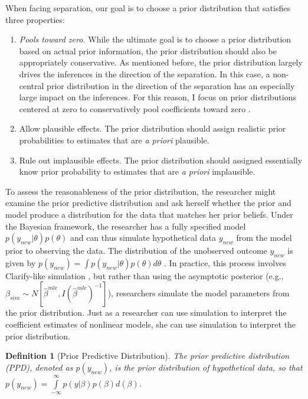 \documentclass[12pt]{article}
\newtheorem{defn}{Definition}
\begin{document}
When facing separation, our goal is to choose a prior distribution that satisfies three properties:
\begin{enumerate}
\item \emph{Pools toward zero.} While the ultimate goal is to choose a prior distribution based on actual prior information, the prior distribution should also be appropriately conservative. As mentioned before, the prior distribution largely drives the inferences in the direction of the separation. In this case, a non-central prior distribution in the direction of the separation has an especially large impact on the inferences. For this reason, I focus on prior distributions centered at zero to conservatively pool coefficients toward zero \citep{GelmanJakulin2007}.
\item Allow plausible effects. The prior distribution should assign realistic prior probabilities to estimates that are \textit{a priori} plausible. 
\item Rule out implausible effects. The prior distribution should assigned essentially know prior probability to estimates that are \textit{a priori} implausible.
\end{enumerate}

To assess the reasonableness of the prior distribution, the researcher might examine the prior predictive distribution and ask herself whether the prior and model produce a distribution for the data that matches her prior beliefs. Under the Bayesian framework, the researcher has a fully specified model $p(y_{new}|\theta)p(\theta)$ and can thus simulate hypothetical data $y_{new}$ from the model prior to observing the data. The distribution of the unobserved outcome $y_{new}$ is given by $p(y_{new}) = \int p(y_{new} | \theta)p(\theta) d\theta$ \citep{Box1980}. In practice, this process involves Clarify-like simulation \citep{KingTomzWittenberg2000}, but rather than using the asymptotic posterior (e.g., $\beta_{sim} \sim N\left[\hat{\beta}^{mle}, I(\hat{\beta}^{mle})^{-1}\right]$), researchers simulate the model parameters from the prior distribution. Just as a researcher can use simulation to interpret the coefficient estimates of nonlinear models, she can use simulation to interpret the prior distribution.

\begin{defn}[Prior Predictive Distribution] The prior predictive distribution (PPD), denoted as $p(y_{new})$, is the prior distribution of hypothetical data, so that $p(y_{new}) = \int\limits_{-\infty}^{\infty} p(y | \beta)p(\beta)d(\beta)$.
\end{defn}
\end{document}
